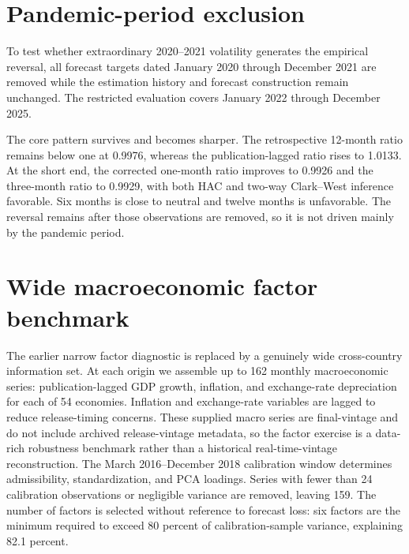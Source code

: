 \documentclass[12pt]{article}
\begin{document}
\section{Pandemic-period exclusion}
To test whether extraordinary 2020--2021 volatility generates the empirical reversal, all forecast targets dated January 2020 through December 2021 are removed while the estimation history and forecast construction remain unchanged. The restricted evaluation covers January 2022 through December 2025.



The core pattern survives and becomes sharper. The retrospective 12-month ratio remains below one at 0.9976, whereas the publication-lagged ratio rises to 1.0133. At the short end, the corrected one-month ratio improves to 0.9926 and the three-month ratio to 0.9929, with both HAC and two-way Clark--West inference favorable. Six months is close to neutral and twelve months is unfavorable. The reversal remains after those observations are removed, so it is not driven mainly by the pandemic period.


\section{Wide macroeconomic factor benchmark}
The earlier narrow factor diagnostic is replaced by a genuinely wide cross-country information set. At each origin we assemble up to 162 monthly macroeconomic series: publication-lagged GDP growth, inflation, and exchange-rate depreciation for each of 54 economies. Inflation and exchange-rate variables are lagged to reduce release-timing concerns. These supplied macro series are final-vintage and do not include archived release-vintage metadata, so the factor exercise is a data-rich robustness benchmark rather than a historical real-time-vintage reconstruction. The March 2016--December 2018 calibration window determines admissibility, standardization, and PCA loadings. Series with fewer than 24 calibration observations or negligible variance are removed, leaving 159. The number of factors is selected without reference to forecast loss: six factors are the minimum required to exceed 80 percent of calibration-sample variance, explaining 82.1 percent.
\end{document}
